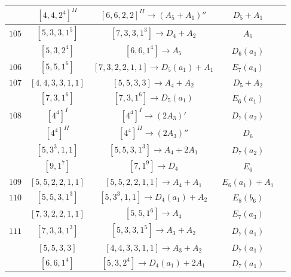 \documentclass[reqno,12pt]{amsart}
\numberwithin{equation}{section}
\theoremstyle{plain}
\theoremstyle{definition}
\begin{document}
\begin{table}[htbp]
{\begin{tabular}{|c|c|c|c|c|}
         &  $ [4,4,2^4]^{II} $  & $[6,6,2,2]^{II}\rightarrow    (A_5+A_1)'' $     &   $ D_5+A_1$      \\\hline
         $ 105 $    &  $ [5, 3, 3, 1^5] $  & $[7,3,3,1^3]\rightarrow     D_4+A_2 $     &   $ A_6$      \\ 
        &  $ [5, 3, 2^4] $  & $[6,6,1^4]\rightarrow     A_5 $     &   $ D_6(a_1)$      \\\hline
        $ 106 $    &  $ [5, 5, 1^6] $  & $[7,3,2,2,1,1]\rightarrow     D_5(a_1)+A_1 $     &   $ E_7(a_4)$        \\\hline
        $ 107 $    &  $ [4,4, 3, 3,1,1] $  & $[5,5,3,3]\rightarrow     A_4+A_2 $     &   $ D_5+A_2$      \\ 
         
          &  $ [7,3,1^6] $  & $[7,3,1^6]\rightarrow     D_5(a_1)$     &   $ E_6(a_1)$      \\ \hline

          $ 108 $    &   $ [4^4]^{I} $  & $[4^4]^I\rightarrow    (2A_3)' $     &   $ D_7(a_2)$      \\ 
          &  $ [4^4]^{II} $  & $ [4^4]^{II} \rightarrow   (2A_3)'' $     &   $ D_6$      \\
         &  $ [5,3^3,1,1] $  & $[5,5,3,1^3]\rightarrow     A_4+2A_1 $     &   $ D_7(a_2)$      \\
         &  $ [9,1^7] $  & $[7,1^9]\rightarrow     D_4 $     &   $ E_6$      \\\hline
         $ 109 $    &  $ [5,5,2,2,1,1] $  & $[5,5,2,2,1,1]\rightarrow    A_4+A_1 $     &   $ E_6(a_1)+A_1$      \\\hline

         $ 110 $    &  $ [5,5, 3, 1^3] $  & $[5,3^3,1,1]\rightarrow     D_4(a_1)+A_2 $     &   $ E_8(b_6)$      \\ 
          &  $ [7,3,2,2,1,1] $  & $[5,5,1^6]\rightarrow     A_4 $     &   $ E_7(a_3)$      \\ \hline
  $ 111 $    &  $ [7, 3, 3, 1^3] $  & $[5,3,3,1^5]\rightarrow     A_3+A_2 $     &   $ D_7(a_1)$      \\ 
          &  $ [5,5,3,3] $  & $[4,4,3,3,1,1]\rightarrow     A_3+A_2 $     &   $D_7(a_1)$      \\
          &  $ [6,6,1^4] $  & $[5,3,2^4]\rightarrow     D_4(a_1)+2A_1$     &   $D_7(a_1)$      \\ \hline
        
        
\end{tabular}}
	\bigskip
	
\end{table}
\end{document}
